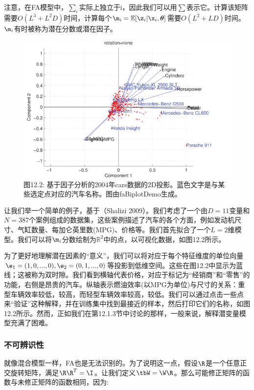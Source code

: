 \documentclass[a4paper]{article}
\begin{document}
注意，在FA模型中，$\sum\nolimits_{i}$实际上独立于i，因此我们可以用$\sum$表示它。计算该矩阵需要$O(L^3+L^2D)$时间，计算每个$\m_i=\mathbb{E}[\z_i\vert\x_i,\boldsymbol{\theta}]$需要$O(L^2+LD)$时间。$\m_i$有时被称为潜在分数或潜在因子。 

\begin{figure}[h]
	\centering
	\includegraphics[width=1\linewidth]{fig/figure2}
	\caption*{图12.2: 基于因子分析的2004年cars数据的2D投影。蓝色文字是与某些选定点对应的汽车名称。图由faBiplotDemo生成。 }
\end{figure}

让我们举一个简单的例子，基于（Shalizi 2009）。我们考虑了一个由$D=11$变量和$N=387$个案例组成的数据集，这些案例描述了汽车的各个方面，例如发动机尺寸、气缸数量、每加仑英里数(MPG)、价格等。我们首先拟合了一个$L=2$维模型。我们可以将$\m_i$分数绘制为$\mathbb{R}^2$中的点，以可视化数据，如图12.2所示。 

为了更好地理解潜在因素的“意义”，我们可以将对应于每个特征维度的单位向量$\e_1=(1,0,...,0),\e_2=(0,1,...,0)$等投影到低维空间。这些在图12.2中显示为蓝线；这被称为双时隙。我们看到横轴代表价格，对应于标记为“经销商”和“零售”的功能，右侧是昂贵的汽车。纵轴表示燃油效率(以MPG为单位)与尺寸的关系：重型车辆效率较低，较高，而轻型车辆效率较高，较低。我们可以通过点击一些点来“验证”这种解释，并在训练集中找到最接近的样本，然后打印它们的名称，如图12.2所示。然而，正如我们在第12.1.3节中讨论的那样，一般来说，解释潜变量模型充满了困难。 

\subsubsection{不可辨识性}
就像混合模型一样，FA也是无法识别的。为了说明这一点，假设$\R$是一个任意正交旋转矩阵，满足$\R\R^T=\I$。让我们定义$\tbW=\W\R$。那么可能修正矩阵的函数与未修正矩阵的函数相同，因为:
\end{document}
